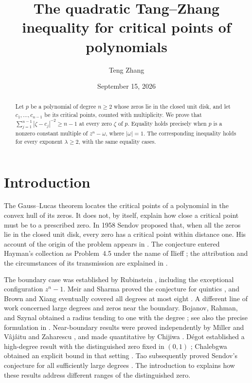 \documentclass[11pt,letterpaper,reqno]{amsart}
\theoremstyle{definition}
\numberwithin{equation}{section}
\begin{document}
\title[The quadratic Tang--Zhang inequality]
{The quadratic Tang--Zhang inequality for critical points of polynomials}
\author[T.~Zhang]{Teng Zhang}
\address{School of Mathematics and Statistics, Xi'an Jiaotong University, Xi'an 710049, P. R. China}
\date{September 15, 2026}
\begin{abstract}
Let $p$ be a polynomial of degree $n\ge2$ whose zeros lie in the closed unit disk, and let $c_1,\ldots,c_{n-1}$ be its critical points, counted with multiplicity. We prove that
$\sum_{j=1}^{n-1}|\zeta-c_j|^{-2}\ge n-1$
at every zero $\zeta$ of $p$. Equality holds precisely when $p$ is a nonzero constant multiple of $z^n-\omega$, where $|\omega|=1$. The corresponding inequality holds for every exponent $\lambda\ge2$, with the same equality cases.
\end{abstract}
\maketitle
\enlargethispage{2pt}

\section{Introduction}\label{sec:intro}

The Gauss--Lucas theorem locates the critical points of a polynomial in the convex hull of its zeros. It does not, by itself, explain how close a critical point must be to a prescribed zero. In 1958 Sendov proposed that, when all the zeros lie in the closed unit disk, every zero has a critical point within distance one. His account of the origin of the problem appears in \cite[pp.~284--285]{Sen02}. The conjecture entered Hayman's collection as Problem~4.5 under the name of Ilieff \cite{Hay67}; the attribution and the circumstances of its transmission are explained in \cite[p.~285]{Sen02}.

The boundary case was established by Rubinstein \cite[pp.~159--160, Theorem~1]{Rub68}, including the exceptional configuration $z^n-1$. Meir and Sharma proved the conjecture for quintics \cite[pp.~466--467, Theorem~4]{MS69}, and Brown and Xiang eventually covered all degrees at most eight \cite[Abstract]{BX99}. A different line of work concerned large degrees and zeros near the boundary. Bojanov, Rahman, and Szynal obtained a radius tending to one with the degree \cite{BRS85}; see also the precise formulation in \cite[pp.~287--288, (3)]{Sen02}. Near-boundary results were proved independently by Miller \cite{Mil93} and V\^aj\^aitu and Zaharescu \cite{VZ93}, and made quantitative by Chijiwa \cite{Chi11}. D\'egot established a high-degree result with the distinguished zero fixed in $(0,1)$ \cite[author version, p.~7, Theorem~9]{Deg14}; Chalebgwa obtained an explicit bound in that setting \cite[author version, p.~1, Theorem~1.1]{Cha20}. Tao subsequently proved Sendov's conjecture for all sufficiently large degrees \cite[author version, p.~2, Theorem~1.2]{Tao22}. The introduction to \cite[arXiv version, pp.~3--5]{Tao22} explains how these results address different ranges of the distinguished zero.
\end{document}
